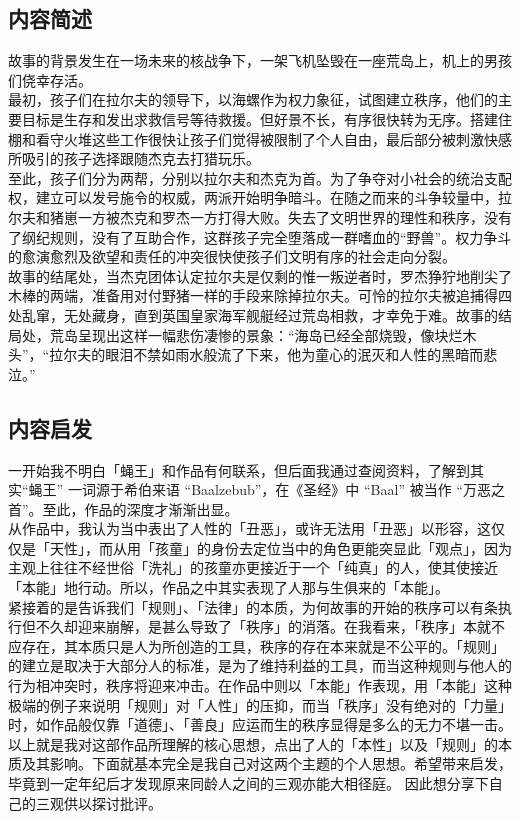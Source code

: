 \documentclass[supercite]{Experimental_Report}
\theoremstyle{definition}
\begin{document}
\subsection{内容简述}
故事的背景发生在一场未来的核战争下，一架飞机坠毁在一座荒岛上，机上的男孩们侥幸存活。
\\最初，孩子们在拉尔夫的领导下，以海螺作为权力象征，试图建立秩序，他们的主要目标是生存和发出求救信号等待救援。但好景不长，有序很快转为无序。搭建住棚和看守火堆这些工作很快让孩子们觉得被限制了个人自由，最后部分被刺激快感所吸引的孩子选择跟随杰克去打猎玩乐。
\\	至此，孩子们分为两帮，分别以拉尔夫和杰克为首。为了争夺对小社会的统治支配权，建立可以发号施令的权威，两派开始明争暗斗。在随之而来的斗争较量中，拉尔夫和猪崽一方被杰克和罗杰一方打得大败。失去了文明世界的理性和秩序，没有了纲纪规则，没有了互助合作，这群孩子完全堕落成一群嗜血的“野兽”。权力争斗的愈演愈烈及欲望和责任的冲突很快使孩子们文明有序的社会走向分裂。
\\	故事的结尾处，当杰克团体认定拉尔夫是仅剩的惟一叛逆者时，罗杰狰狞地削尖了木棒的两端，准备用对付野猪一样的手段来除掉拉尔夫。可怜的拉尔夫被追捕得四处乱窜，无处藏身，直到英国皇家海军舰艇经过荒岛相救，才幸免于难。故事的结局处，荒岛呈现出这样一幅悲伤凄惨的景象：“海岛已经全部烧毁，像块烂木头”，“拉尔夫的眼泪不禁如雨水般流了下来，他为童心的泯灭和人性的黑暗而悲泣。”

\subsection{内容启发}
一开始我不明白「蝇王」和作品有何联系，但后面我通过查阅资料，了解到其实“蝇王” 一词源于希伯来语 “Baalzebub”，在《圣经》中 “Baal” 被当作 “万恶之首”。至此，作品的深度才渐渐出显。
\\从作品中，我认为当中表出了人性的「丑恶」，或许无法用「丑恶」以形容，这仅仅是「天性」，而从用「孩童」的身份去定位当中的角色更能突显此「观点」，因为主观上往往不经世俗「洗礼」的孩童亦更接近于一个「纯真」的人，使其使接近「本能」地行动。所以，作品之中其实表现了人那与生俱来的「本能」。
\\紧接着的是告诉我们「规则」、「法律」的本质，为何故事的开始的秩序可以有条执行但不久却迎来崩解，是甚么导致了「秩序」的消落。在我看来，「秩序」本就不应存在，其本质只是人为所创造的工具，秩序的存在本来就是不公平的。「规则」的建立是取决于大部分人的标准，是为了维持利益的工具，而当这种规则与他人的行为相冲突时，秩序将迎来冲击。在作品中则以「本能」作表现，用「本能」这种极端的例子来说明「规则」对「人性」的压抑，而当「秩序」没有绝对的「力量」时，如作品般仅靠「道德」、「善良」应运而生的秩序显得是多么的无力不堪一击。
\\以上就是我对这部作品所理解的核心思想，点出了人的「本性」以及「规则」的本质及其影响。下面就基本完全是我自己对这两个主题的个人思想。希望带来启发，毕竟到一定年纪后才发现原来同龄人之间的三观亦能大相径庭。
因此想分享下自己的三观供以探讨批评。
\end{document}
